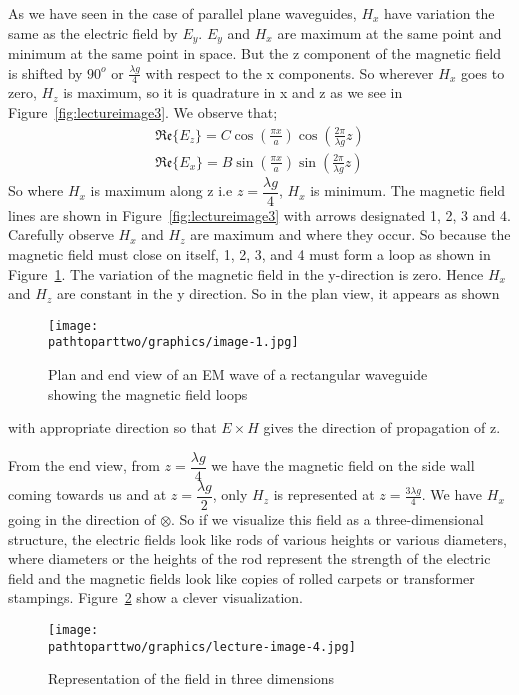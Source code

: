 As we have seen in the case of parallel plane waveguides, $H_{x}$ have variation the same as the electric field by $E_{y}$. $E_{y}$ and $H_{x}$ are maximum at the same point and minimum at the same point in space. But the z component of the magnetic field is shifted by $90^{o}$ or $\frac{\lambda g}{4}$ with respect to the x components. So wherever $H_{x}$ goes to zero, $H_{z}$ is maximum, so it is quadrature in x and z as we see in Figure~\ref{fig:lectureimage3}. We observe that;
\begin{align}
\mathfrak{Re}\{E_z\} = C\cos(\frac{\pi x}{a})\cos(\frac{2\pi}{\lambda g}z)\\
\mathfrak{Re}\{E_{x}\} = B\sin(\frac{\pi x}{a})\sin(\frac{2\pi}{\lambda g}z)
\end{align}
So where $H_{x}$ is maximum along z i.e  $z=\dfrac{\lambda g}{4}$, $H_{x}$ is minimum. The magnetic field lines are shown in Figure~\ref{fig:lectureimage3} with arrows designated 1, 2, 3 and 4. Carefully observe $H_{x}$ and $H_{z}$ are maximum and where they occur. So because the magnetic field must close on itself, 1, 2, 3, and 4 must form a loop as shown in Figure~\ref{fig:image1}. The variation of the magnetic field in the y-direction is zero. Hence $H_{x}$ and $H_{z}$ are constant in the y direction. So in the plan view, it appears as shown 
\begin{figure}[h]
\centering
\texttt{[image: \\pathtoparttwo/graphics/image-1.jpg]}
\label{fig:image1}
\caption{Plan and end view of an EM wave of a rectangular waveguide showing the magnetic field loops}
\end{figure}
with appropriate direction so that $E\times H$ gives the direction of propagation of z. 

From the end view, from $z=\dfrac{\lambda g}{4}$ we have the magnetic field on the side wall coming towards us and at $z=\dfrac{\lambda g}{2}$, only $H_{z}$ is represented at $z=\frac{3\lambda g}{4}$. We have $H_{x}$ going in the direction of $\otimes$. So if we visualize this field as a three-dimensional structure, the electric fields look like rods of various heights or various diameters, where diameters or the heights of the rod represent the strength of the electric field and the magnetic fields look like copies of rolled carpets or transformer stampings. Figure~\ref{fig:lectureimage4} show a clever visualization.
\begin{figure}[h]
\centering
\texttt{[image: \\pathtoparttwo/graphics/lecture-image-4.jpg]}
\label{fig:lectureimage4}
\caption{Representation of the field in three dimensions}
\end{figure}
	
